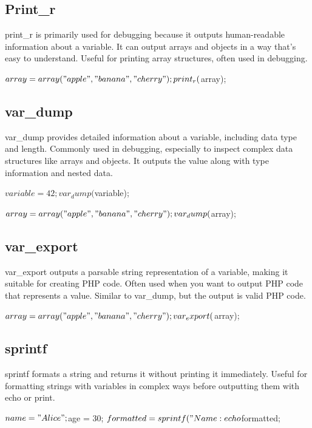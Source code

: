 \documentclass{report}
\begin{document}
    \bigbreak \noindent 
    \subsection{Print\_r}
    \bigbreak \noindent 
    print\_r is primarily used for debugging because it outputs human-readable information about a variable.
    \bigbreak \noindent 
    It can output arrays and objects in a way that’s easy to understand.
    \bigbreak \noindent 
    Useful for printing array structures, often used in debugging.
    \bigbreak \noindent 
    \begin{phpcode}
        $array = array("apple", "banana", "cherry");
        print_r($array);
    \end{phpcode}

    \bigbreak \noindent 
    \subsection{var\_dump}
    \bigbreak \noindent 
    var\_dump provides detailed information about a variable, including data type and length.
    \bigbreak \noindent 
    Commonly used in debugging, especially to inspect complex data structures like arrays and objects.
    \bigbreak \noindent 
    It outputs the value along with type information and nested data.
    \bigbreak \noindent 
    \begin{phpcode}
        $variable = 42;
        var_dump($variable);

        $array = array("apple", "banana", "cherry");
        var_dump($array);
    \end{phpcode}

    \bigbreak \noindent 
    \subsection{var\_export}
    \bigbreak \noindent 
    var\_export outputs a parsable string representation of a variable, making it suitable for creating PHP code.
    \bigbreak \noindent 
    Often used when you want to output PHP code that represents a value.
    \bigbreak \noindent 
    Similar to var\_dump, but the output is valid PHP code.
    \bigbreak \noindent 
    \begin{phpcode}
        $array = array("apple", "banana", "cherry");
        var_export($array);
    \end{phpcode}

    \bigbreak \noindent 
    \subsection{sprintf}
    \bigbreak \noindent 
    sprintf formats a string and returns it without printing it immediately.
    \bigbreak \noindent 
    Useful for formatting strings with variables in complex ways before outputting them with echo or print.
    \bigbreak \noindent 
    \begin{phpcode}
        $name = "Alice";
        $age = 30;
        $formatted = sprintf("Name: %
        echo $formatted;
    \end{phpcode}
\end{document}
